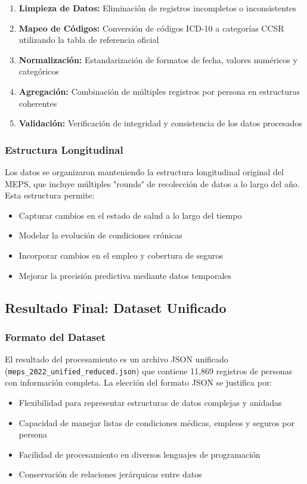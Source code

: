 \documentclass[12pt,a4paper]{article}
\begin{document}
\begin{enumerate}
    \item \textbf{Limpieza de Datos:} Eliminación de registros incompletos o inconsistentes
    \item \textbf{Mapeo de Códigos:} Conversión de códigos ICD-10 a categorías CCSR utilizando la tabla de referencia oficial
    \item \textbf{Normalización:} Estandarización de formatos de fecha, valores numéricos y categóricos
    \item \textbf{Agregación:} Combinación de múltiples registros por persona en estructuras coherentes
    \item \textbf{Validación:} Verificación de integridad y consistencia de los datos procesados
\end{enumerate}

\subsubsection{Estructura Longitudinal}
Los datos se organizaron manteniendo la estructura longitudinal original del MEPS, que incluye múltiples "rounds" de recolección de datos a lo largo del año. Esta estructura permite:
\begin{itemize}
    \item Capturar cambios en el estado de salud a lo largo del tiempo
    \item Modelar la evolución de condiciones crónicas
    \item Incorporar cambios en el empleo y cobertura de seguros
    \item Mejorar la precisión predictiva mediante datos temporales
\end{itemize}

\subsection{Resultado Final: Dataset Unificado}

\subsubsection{Formato del Dataset}
El resultado del procesamiento es un archivo JSON unificado (\texttt{meps\_2022\_unified\_reduced.json}) que contiene 11,869 registros de personas con información completa. La elección del formato JSON se justifica por:
\begin{itemize}
    \item Flexibilidad para representar estructuras de datos complejas y anidadas
    \item Capacidad de manejar listas de condiciones médicas, empleos y seguros por persona
    \item Facilidad de procesamiento en diversos lenguajes de programación
    \item Conservación de relaciones jerárquicas entre datos
\end{itemize}
\end{document}
